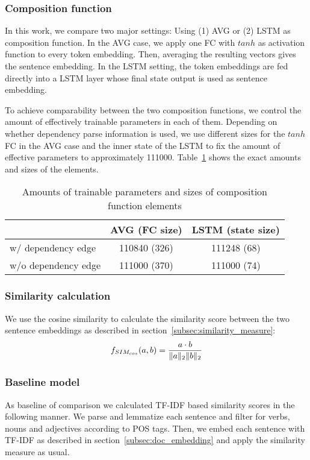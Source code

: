 \subsubsection{Composition function}
In this work, we compare two major settings: Using (1) \acf{AVG} or (2) \acf{LSTM} as composition function. 
In the \ac{AVG} case, we apply one \acf{FC} with $tanh$ as activation function to every token embedding. Then, averaging the resulting vectors gives the sentence embedding.
In the \ac{LSTM} setting, the token embeddings are fed directly into a LSTM layer whose final state output is used as sentence embedding. %

To achieve comparability between the two composition functions, we control the amount of effectively trainable parameters in each of them. Depending on whether dependency parse information is used, we use different sizes for the $tanh$ \ac{FC} in the \ac{AVG} case and the inner state of the \ac{LSTM} to fix the amount of effective parameters to approximately 111000. Table~\ref{tab:sizes} shows the exact amounts and sizes of the elements. %

\begin{table}[!htb]
  \centering
  \begin{tabular}{ l | c | c }
      & AVG (FC size) & LSTM (state size) \\ \hline
    w/ dependency edge & 110840 (326) & 111248 (68) \\ 
    w/o dependency edge & 111000 (370) & 111000 (74) \\
  \end{tabular}
  \caption{Amounts of trainable parameters and sizes of composition function elements}
  \label{tab:sizes}
\end{table}

\subsubsection{Similarity calculation}
We use the cosine similarity to calculate the similarity score between the two sentence embeddings as described in section~\ref{subsec:similarity_measure}:
\begin{equation}
f_{SIM_{cos}}(a,b) = \frac{a \cdot b}{\lVert a\rVert_2\lVert b\rVert_2} 
\end{equation}

\subsubsection{Baseline model}
As baseline of comparison we calculated TF-IDF based similarity scores in the following manner. We parse and lemmatize each sentence and filter for verbs, nouns and adjectives according to POS tags. Then, we embed each sentence with TF-IDF as described in section~\ref{subsec:doc_embedding} and apply the similarity measure as usual. 

